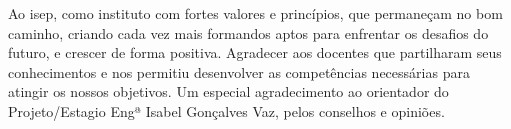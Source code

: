 \begin{acknowledgements}
Ao \ac{isep}, como instituto com fortes valores e princípios, que permaneçam no bom caminho, criando cada vez mais formandos aptos para enfrentar os desafios do futuro, e crescer de forma positiva. Agradecer aos docentes que partilharam seus conhecimentos e nos permitiu desenvolver as competências necessárias para atingir os nossos objetivos.
\emptyline
Um especial agradecimento ao orientador do Projeto/Estagio Engª Isabel Gonçalves Vaz, pelos conselhos e opiniões.
\end{acknowledgements}
